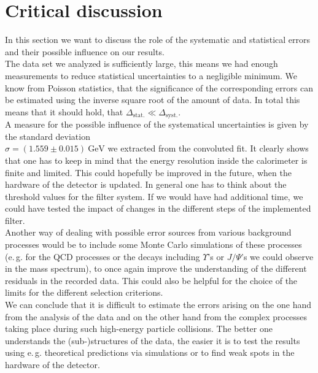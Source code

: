 \documentclass[twocolumn,
			   showpacs,%
               nofootinbib,
               aps,%
               prd,
               notitlepage,
               showkeys,
               10pt]{revtex4-1}
\begin{document}
\section{Critical discussion}
In this section we want to discuss the role of the systematic and statistical errors and their possible influence on our results.\\
The data set we analyzed is sufficiently large, this means we had enough measurements to reduce statistical uncertainties to a negligible minimum. We know from Poisson statistics, that the significance of the corresponding errors can be estimated using the inverse square root of the amount of data. In total this means that it should hold, that $\Delta_{\mathrm{stat.}} \ll \Delta_{\mathrm{syst.}}$. \\
A measure for the possible influence of the systematical uncertainties is given by the standard deviation \\ $\sigma = (1.559 \pm 0.015) \ \text{GeV}$ we extracted from the convoluted fit. It clearly shows that one has to keep in mind that the energy resolution inside the calorimeter is finite and limited. This could hopefully be improved in the future, when the hardware of the detector is updated.  In general one has to think about the threshold values for the filter system. If we would have had additional time, we could have tested the impact of changes in the different steps of the implemented filter. \\
Another way of dealing with possible error sources from various background processes would be to include some Monte Carlo simulations of these processes (e.\,g. for the QCD processes or the decays including $\Upsilon$'s or $J/\Psi$'s we could observe in the mass spectrum), to once again improve the understanding of the different residuals in the recorded data. This could also be helpful for the choice of the limits for the different selection criterions. \\
We can conclude that it is difficult to estimate the errors arising on the one hand from the analysis of the data and on the other hand from the complex processes taking place during such high-energy particle collisions. The better one understands the (sub-)structures of the data, the easier it is to test the results using e.\,g. theoretical predictions via simulations or to find weak spots in the hardware of the detector.
\end{document}

